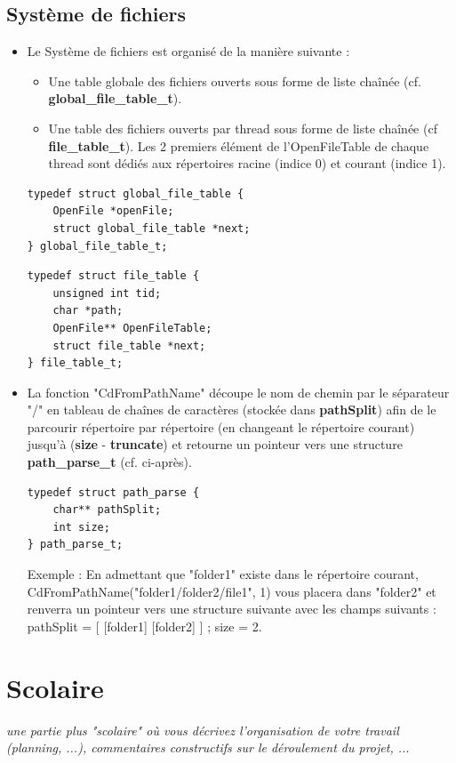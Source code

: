 \documentclass{article}
\begin{document}
\subsection{Système de fichiers}
\begin{itemize}
\item
Le Système de fichiers est organisé de la manière suivante :
\begin{itemize}
	\item
	Une table globale des fichiers ouverts sous forme de liste chaînée (cf.  \textbf{global\_file\_table\_t}).
	\item
	Une table des fichiers ouverts par thread sous forme de liste chaînée (cf \textbf{file\_table\_t}). Les 2 premiers élément de l'OpenFileTable de chaque thread sont dédiés aux répertoires racine (indice 0) et courant (indice 1).
	
\end{itemize}

 \begin{lstlisting}[frame=single]
typedef struct global_file_table {
    OpenFile *openFile;
    struct global_file_table *next;
} global_file_table_t;
  \end{lstlisting}
  
  \begin{lstlisting}[frame=single]
typedef struct file_table {
    unsigned int tid;
    char *path;
    OpenFile** OpenFileTable;
    struct file_table *next;
} file_table_t;
  \end{lstlisting}
 
 \item
La fonction "CdFromPathName"  découpe le nom de chemin par le séparateur "/" en tableau de chaînes de caractères (stockée dans \textbf{pathSplit}) afin de le parcourir répertoire par répertoire (en changeant le répertoire courant) jusqu'à (\textbf{size} - \textbf{truncate}) et retourne un pointeur vers une  structure \textbf{path\_parse\_t} (cf. ci-après).


  \begin{lstlisting}[frame=single]
  typedef struct path_parse { 
    char** pathSplit;   
    int size;   
} path_parse_t;
  \end{lstlisting}

  Exemple : 
  En admettant que "folder1" existe dans le répertoire courant, CdFromPathName("folder1/folder2/file1", 1) vous placera dans "folder2" et renverra un pointeur vers une structure suivante avec les champs suivants : 
  pathSplit = [ [folder1] [folder2] ] ; size = 2.
 
 \end{itemize} 

\section{Scolaire}
\textit{une partie plus "scolaire" où vous décrivez l'organisation de votre travail (planning, ...), commentaires constructifs sur le déroulement du projet, ...}
\vspace{5mm}
\end{document}
